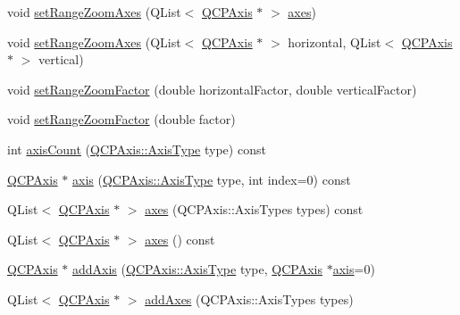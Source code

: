 \begin{DoxyCompactItemize}
\item 
void \mbox{\hyperlink{class_q_c_p_axis_rect_a89c1ab7ee6d2a14b56c57c9a796ba623}{set\+Range\+Zoom\+Axes}} (Q\+List$<$ \mbox{\hyperlink{class_q_c_p_axis}{Q\+C\+P\+Axis}} $\ast$ $>$ \mbox{\hyperlink{class_q_c_p_axis_rect_a8db4722cb93e9c4a6f0d91150c200867}{axes}})
\item 
void \mbox{\hyperlink{class_q_c_p_axis_rect_ae29d6e9e54ebd981769c986e498ae118}{set\+Range\+Zoom\+Axes}} (Q\+List$<$ \mbox{\hyperlink{class_q_c_p_axis}{Q\+C\+P\+Axis}} $\ast$ $>$ horizontal, Q\+List$<$ \mbox{\hyperlink{class_q_c_p_axis}{Q\+C\+P\+Axis}} $\ast$ $>$ vertical)
\item 
void \mbox{\hyperlink{class_q_c_p_axis_rect_a895d7ac745ea614e04056244b3c138ac}{set\+Range\+Zoom\+Factor}} (double horizontal\+Factor, double vertical\+Factor)
\item 
void \mbox{\hyperlink{class_q_c_p_axis_rect_ae83d187b03fc6fa4f00765ad50cd3fc3}{set\+Range\+Zoom\+Factor}} (double factor)
\item 
int \mbox{\hyperlink{class_q_c_p_axis_rect_a85b321acec0f694d8b5fdeafdbff3133}{axis\+Count}} (\mbox{\hyperlink{class_q_c_p_axis_ae2bcc1728b382f10f064612b368bc18a}{Q\+C\+P\+Axis\+::\+Axis\+Type}} type) const
\item 
\mbox{\hyperlink{class_q_c_p_axis}{Q\+C\+P\+Axis}} $\ast$ \mbox{\hyperlink{class_q_c_p_axis_rect_a583ae4f6d78b601b732183f6cabecbe1}{axis}} (\mbox{\hyperlink{class_q_c_p_axis_ae2bcc1728b382f10f064612b368bc18a}{Q\+C\+P\+Axis\+::\+Axis\+Type}} type, int index=0) const
\item 
Q\+List$<$ \mbox{\hyperlink{class_q_c_p_axis}{Q\+C\+P\+Axis}} $\ast$ $>$ \mbox{\hyperlink{class_q_c_p_axis_rect_a8db4722cb93e9c4a6f0d91150c200867}{axes}} (Q\+C\+P\+Axis\+::\+Axis\+Types types) const
\item 
Q\+List$<$ \mbox{\hyperlink{class_q_c_p_axis}{Q\+C\+P\+Axis}} $\ast$ $>$ \mbox{\hyperlink{class_q_c_p_axis_rect_a11657b8faebe9677180860e8057ede26}{axes}} () const
\item 
\mbox{\hyperlink{class_q_c_p_axis}{Q\+C\+P\+Axis}} $\ast$ \mbox{\hyperlink{class_q_c_p_axis_rect_a2dc336092ccc57d44a46194c8a23e4f4}{add\+Axis}} (\mbox{\hyperlink{class_q_c_p_axis_ae2bcc1728b382f10f064612b368bc18a}{Q\+C\+P\+Axis\+::\+Axis\+Type}} type, \mbox{\hyperlink{class_q_c_p_axis}{Q\+C\+P\+Axis}} $\ast$\mbox{\hyperlink{class_q_c_p_axis_rect_a583ae4f6d78b601b732183f6cabecbe1}{axis}}=0)
\item 
Q\+List$<$ \mbox{\hyperlink{class_q_c_p_axis}{Q\+C\+P\+Axis}} $\ast$ $>$ \mbox{\hyperlink{class_q_c_p_axis_rect_a792e1f3d9cb1591fca135bb0de9b81fc}{add\+Axes}} (Q\+C\+P\+Axis\+::\+Axis\+Types types)

\end{DoxyCompactItemize}
